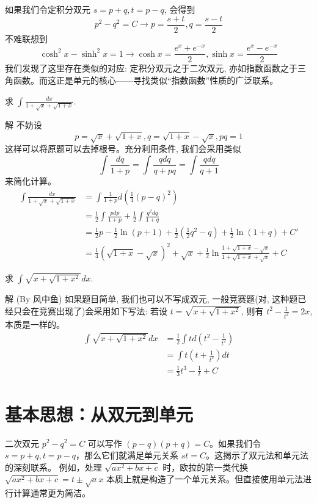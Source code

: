 \documentclass[lang=cn,newtx,10pt,scheme=chinese]{elegantbook}
\begin{document}
如果我们令定积分双元 $s = p + q, t = p - q$, 会得到
$$
p^2 - q^2 = C \to p = \frac{s + t}{2}, q = \frac{s - t}{2}
$$
不难联想到
$$
\cosh^2 x - \sinh^2 x = 1 \to \cosh x = \frac{e^x + e^{-x}}{2}, \sinh x = \frac{e^x - e^{-x}}{2}
$$
我们发现了这里存在类似的对应: 定积分双元之于二次双元, 亦如指数函数之于三角函数。而这正是单元的核心——寻找类似“指数函数”性质的广泛联系。
\begin{example}
  求 $\int \frac{dx}{1 + \sqrt{x} + \sqrt{1 + x}}$.
\end{example}
\begin{solution}
  解 不妨设
  $$
  p = \sqrt{x} + \sqrt{1 + x}, q = \sqrt{1 + x} - \sqrt{x}, pq = 1
  $$
  这样可以将原题可以去掉根号。充分利用条件, 我们会采用类似
  $$
  \int \frac{dq}{1 + p} = \int \frac{q dq}{q + pq} = \int \frac{q dq}{q + 1}
  $$
  来简化计算。
  $$
  \begin{aligned}
  \int \frac{dx}{1 + \sqrt{x} + \sqrt{1 + x}} &= \int \frac{1}{1 + p} d\left(\frac{1}{4}(p - q)^2\right) \\
  &= \frac{1}{2} \int \frac{p dp}{1 + p} + \frac{1}{2} \int \frac{q^2 dq}{1 + q} \\
  &= \frac{1}{2}p - \frac{1}{2}\ln(p + 1) + \frac{1}{2}\left(\frac{1}{2}q^2 - q\right) + \frac{1}{2}\ln(1 + q) + C' \\
  &= \frac{1}{4}(\sqrt{1 + x} - \sqrt{x})^2 + \sqrt{x} + \frac{1}{2} \ln \frac{1 + \sqrt{1 + x} - \sqrt{x}}{1 + \sqrt{1 + x} + \sqrt{x}} + C
  \end{aligned}
  $$
\end{solution}

\begin{example}
  求 $\int \sqrt{x + \sqrt{1 + x^2}} dx$.
\end{example}
\begin{solution}
  解 (By 风中鱼) 如果题目简单, 我们也可以不写成双元, 一般竞赛题(对, 这种题已经只会在竞赛出现了)会采用如下写法: 若设 $t = \sqrt{x + \sqrt{1 + x^2}}$, 则有 $t^2 - \frac{1}{t^2} = 2x$, 本质是一样的。
  $$
  \begin{aligned}
  \int \sqrt{x + \sqrt{1 + x^2}} dx &= \frac{1}{2} \int t d\left(t^2 - \frac{1}{t^2}\right) \\
  &= \int t \left(t + \frac{1}{t^3}\right) dt \\
  &= \frac{1}{3}t^3 - \frac{1}{t} + C
  \end{aligned}
  $$
\end{solution}
\section{基本思想：从双元到单元}
二次双元 $p^2-q^2=C$ 可以写作 $(p-q)(p+q)=C$。如果我们令 $s=p+q, t=p-q$，那么它们就满足单元关系 $st=C$。这揭示了双元法和单元法的深刻联系。
例如，处理 $\sqrt{ax^2+bx+c}$ 时，欧拉的第一类代换 $\sqrt{ax^2+bx+c} = t \pm \sqrt{a}x$ 本质上就是构造了一个单元关系。但直接使用单元法进行计算通常更为简洁。
\end{document}
